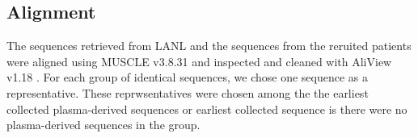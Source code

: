 \documentclass[12pt,onecolumn,twoside]{pnas-new}
\begin{document}
{\subsection*{Alignment}
The sequences retrieved from LANL and the sequences from the reruited patients were aligned using MUSCLE v3.8.31 \cite{muscle} and inspected and cleaned with AliView v1.18 \cite{aliview}.
For each group of identical sequences, we chose one sequence as a representative.
These reprwsentatives were chosen among the the earliest collected plasma-derived sequences or earliest collected sequence is there were no plasma-derived sequences in the group.
}
\end{document}
